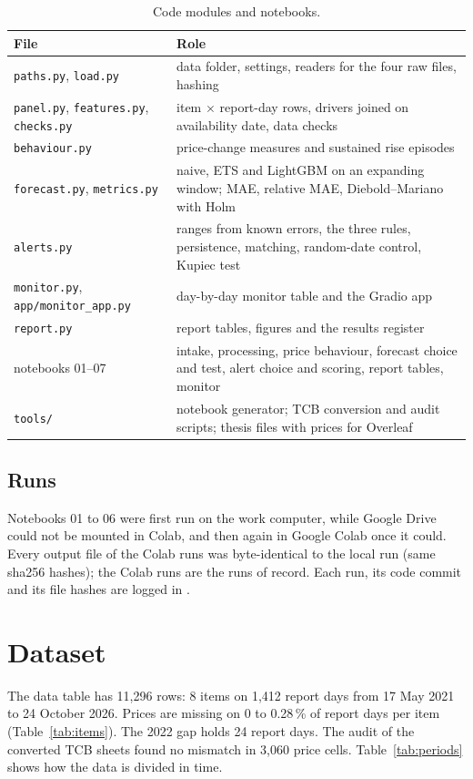 \begin{table}[H]\centering\small
\caption[Code modules and notebooks]{Code modules and notebooks.}\label{tab:modules}
\begin{tabularx}{\linewidth}{>{\raggedright\arraybackslash}p{4.3cm}X}
\toprule
\textbf{File} & \textbf{Role} \\
\midrule
\texttt{paths.py}, \texttt{load.py} & data folder, settings, readers for the four raw files, hashing \\
\texttt{panel.py}, \texttt{features.py}, \texttt{checks.py} & item $\times$ report-day rows, drivers joined on availability date, data checks \\
\texttt{behaviour.py} & price-change measures and sustained rise episodes \\
\texttt{forecast.py}, \texttt{metrics.py} & naive, ETS and LightGBM on an expanding window; MAE, relative MAE, Diebold--Mariano with Holm \\
\texttt{alerts.py} & ranges from known errors, the three rules, persistence, matching, random-date control, Kupiec test \\
\texttt{monitor.py}, \texttt{app/monitor\_app.py} & day-by-day monitor table and the Gradio app \\
\texttt{report.py} & report tables, figures and the results register \\
notebooks 01--07 & intake, processing, price behaviour, forecast choice and test, alert choice and scoring, report tables, monitor \\
\texttt{tools/} & notebook generator; TCB conversion and audit scripts; thesis files with prices for Overleaf \\
\bottomrule
\end{tabularx}
\end{table}

\subsection{Runs}
Notebooks 01 to 06 were first run on the work computer, while Google Drive could not be mounted in Colab, and then again in Google Colab once it could. Every output file of the Colab runs was byte-identical to the local run (same sha256 hashes); the Colab runs are the runs of record. Each run, its code commit and its file hashes are logged in .

\section{Dataset}
The data table has 11,296 rows: 8 items on 1,412 report days from 17 May 2021 to 24 October 2026. Prices are missing on 0 to 0.28\,\% of report days per item (Table~\ref{tab:items}). The 2022 gap holds 24 report days. The audit of the converted TCB sheets found no mismatch in 3,060 price cells. Table~\ref{tab:periods} shows how the data is divided in time.

